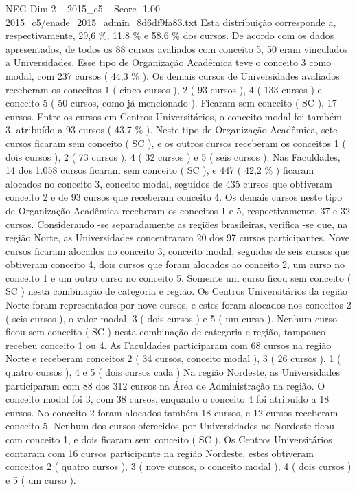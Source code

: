 \begin{textsample}{NEG Dim 2 – 2015\_c5 – Score -1.00 – 2015\_c5/enade\_2015\_admin\_8d6df9fa83.txt}
Esta distribuição corresponde a, respectivamente, 29,6 \%, 11,8 \% e 58,6 \% dos cursos.
De acordo com os dados apresentados, de todos os 88 cursos avaliados com conceito 5, 50 eram vinculados a Universidades.
Esse tipo de Organização Acadêmica teve o conceito 3 como modal, com 237 cursos ( 44,3 \% ).
Os demais cursos de Universidades avaliados receberam os conceitos 1 ( cinco cursos ), 2 ( 93 cursos ), 4 ( 133 cursos ) e conceito 5 ( 50 cursos, como já mencionado ).
Ficaram sem conceito ( SC ), 17 cursos.
Entre os cursos em Centros Universitários, o conceito modal foi também 3, atribuído a 93 cursos ( 43,7 \% ).
Neste tipo de Organização Acadêmica, sete cursos ficaram sem conceito ( SC ), e os outros cursos receberam os conceitos 1 ( dois cursos ), 2 ( 73 cursos ), 4 ( 32 cursos ) e 5 ( seis cursos ).
Nas Faculdades, 14 dos 1.058 cursos ficaram sem conceito ( SC ), e 447 ( 42,2 \% ) ficaram alocados no conceito 3, conceito modal, seguidos de 435 cursos que obtiveram conceito 2 e de 93 cursos que receberam conceito 4.
Os demais cursos neste tipo de Organização Acadêmica receberam os conceitos 1 e 5, respectivamente, 37 e 32 cursos.
Considerando -se separadamente as regiões brasileiras, verifica -se que, na região Norte, as Universidades concentraram 20 dos 97 cursos participantes.
Nove cursos ficaram alocados ao conceito 3, conceito modal, seguidos de seis cursos que obtiveram conceito 4, dois cursos que foram alocados ao conceito 2, um curso no conceito 1 e um outro curso no conceito 5.
Somente um curso ficou sem conceito ( SC ) nesta combinação de categoria e região.
Os Centros Universitários da região Norte foram representados por nove cursos, e estes foram alocados nos conceitos 2 ( seis cursos ), o valor modal, 3 ( dois cursos ) e 5 ( um curso ).
Nenhum curso ficou sem conceito ( SC ) nesta combinação de categoria e região, tampouco recebeu conceito 1 ou 4.
As Faculdades participaram com 68 cursos na região Norte e receberam conceitos 2 ( 34 cursos, conceito modal ), 3 ( 26 cursos ), 1 ( quatro cursos ), 4 e 5 ( dois cursos cada ) Na região Nordeste, as Universidades participaram com 88 dos 312 cursos na Área de Administração na região.
O conceito modal foi 3, com 38 cursos, enquanto o conceito 4 foi atribuído a 18 cursos.
No conceito 2 foram alocados também 18 cursos, e 12 cursos receberam conceito 5.
Nenhum dos cursos oferecidos por Universidades no Nordeste ficou com conceito 1, e dois ficaram sem conceito ( SC ).
Os Centros Universitários contaram com 16 cursos participante na região Nordeste, estes obtiveram conceitos 2 ( quatro cursos ), 3 ( nove cursos, o conceito modal ), 4 ( dois cursos ) e 5 ( um curso ).

\end{textsample}
